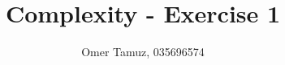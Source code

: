 \documentclass[11pt]{article} \usepackage{amssymb}
\begin{document}
\title{Complexity - Exercise 1}

 \author{Omer Tamuz, 035696574}
\maketitle


\end{document}
